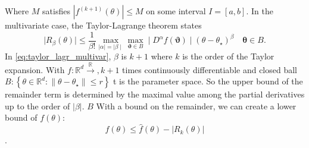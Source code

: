 Where $M$ satisfies $|f^{\left(k+1\right)}\left(\theta\right)| \leq M$ on some interval $I = \left[a, b\right]$.
In the multivariate case, the Taylor-Lagrange theorem states
\begin{equation}\label{eq:taylor_lagr_multivar}
\mid R_{\beta}\left(\theta\right) \mid \leq\frac{1}{\beta!}\max_{\mid \alpha \mid  = \mid \beta\mid } \max_{\mathbf{\vartheta} \in B}\mid D^{\alpha} f\left(\mathbf{\vartheta}\right)\mid \left(\theta - \theta_{\star}\right)^{\beta}\quad \mathbf{\theta}\in B. 
\end{equation}
In \eqref{eq:taylor_lagr_multivar}, $\beta$ is $k+1$ where $k$ is the order of the Taylor expansion. With $f: \mathbb{R}^{d} \xrightarrow{\mathbb{R}}, k+1$ times continuously differentiable and closed ball $B: \left\{\theta\in \mathbb{R}^d: \lVert \theta - \theta_{\star}\rVert \leq r \right\} $ t is the parameter space.  So the upper bound of the remainder term is determined by the maximal value among the partial derivatives up to the order of $\left| \beta\right|$. $B$
With a bound on the remainder, we can create a lower bound of $f\left(\theta\right)$: 
\begin{equation}\label{eq:lower_bound}
    f\left(\theta\right) \leq \hat{f}\left(\theta\right) - \left|R_k\left(\theta\right)\right|
\end{equation}. 

